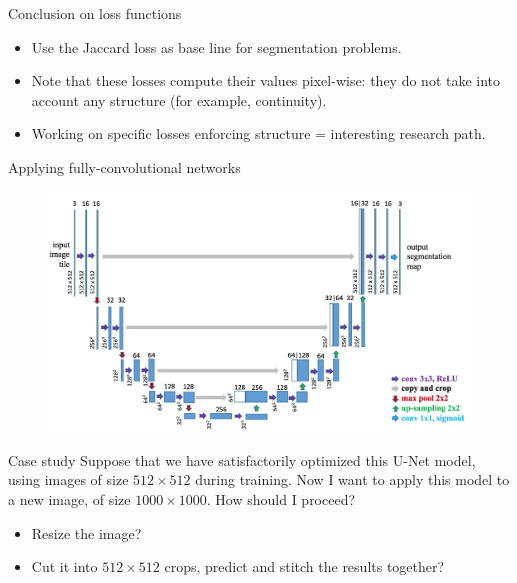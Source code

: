 \documentclass[xcolor=pdftex,dvipsnames,table,mathserif]{beamer}
\begin{document}
\begin{frame}{Conclusion on loss functions}

  \begin{itemize}
  \item Use the Jaccard loss as base line for segmentation problems.
  \item Note that these losses compute their values pixel-wise: they do not take into account any structure (for example, continuity).
  \item Working on specific losses enforcing structure = interesting research path.
  \end{itemize}
\end{frame}


\begin{frame}{Applying fully-convolutional networks}

\begin{figure}[ht]
  \centering
  \includegraphics[height=0.35\textheight]{unet_lo}
\end{figure}


\begin{block}{Case study}
Suppose that we have satisfactorily optimized this U-Net model, using images of size $512 \times 512$ during training. Now I want to apply this model to a new image, of size $1000 \times 1000$. How should I proceed?
\end{block}

\begin{itemize}
\item Resize the image?
\item Cut it into $512 \times 512$ crops, predict and stitch the results together?
\end{itemize}

\end{frame}
\end{document}

